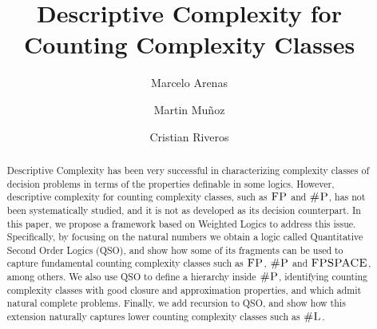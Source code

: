 \documentclass{lmcs} %
\theoremstyle{plain}\newtheorem{satz}[thm]{Satz} %
\def\eg{{\em e.g.}}
\begin{document}
\title[Counting]{Descriptive Complexity for Counting Complexity Classes}

\author[M.~Arenas]{Marcelo Arenas}	%
\address{Pontificia Universidad Cat\'olica de Chile}	%

\author[M.~Munoz]{Martin Mu\~noz}	%
\address{Pontificia Universidad Cat\'olica de Chile}	%

\author[C.~Riveros]{Cristian Riveros}	%
\address{Pontificia Universidad Cat\'olica de Chile}	%





\begin{abstract}
  \noindent Descriptive Complexity has been very successful in characterizing complexity classes of decision problems in terms of the properties definable in some logics. However, descriptive complexity for counting complexity classes, such as $\text{\sc FP}$ and $\text{\sc \#P}$, has not been systematically studied, and it is not as developed as its decision counterpart. In this paper, we propose a framework based on Weighted Logics to address this issue. Specifically, by focusing on the natural numbers we obtain a logic called Quantitative Second Order Logics (QSO), and show how some of its fragments can be used to capture fundamental counting complexity classes such as $\text{\sc FP}$, $\text{\sc \#P}$ and $\text{\sc FPSPACE}$, among others. We also use QSO to define a hierarchy inside $\text{\sc \#P}$, identifying counting complexity classes with good closure and approximation properties, and which admit natural complete problems. Finally, we add recursion to QSO, and show how this extension naturally captures lower counting complexity classes such as $\text{\sc \#L}$.
\end{abstract}
\end{document}
